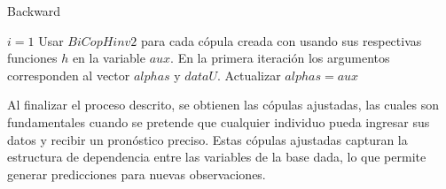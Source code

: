 \begin{algorithm}[H]
      \caption{Backward}
      \label{algbackward}
      \begin{algorithmic}[1]  
        
        \State $i = 1$
          \State Usar $BiCopHinv2$ para cada cópula creada con usando sus respectivas funciones $h$ en la variable $aux$. En la primera iteración los argumentos corresponden al vector $alphas$ y $dataU$.
          \State Actualizar $alphas = aux$
        \EndWhile
       
      \end{algorithmic}
    \end{algorithm}

Al finalizar el proceso descrito, se obtienen las cópulas ajustadas, las cuales son fundamentales cuando se pretende que cualquier individuo pueda ingresar sus datos y recibir un pronóstico preciso. Estas cópulas ajustadas capturan la estructura de dependencia entre las variables de la base dada, lo que permite generar predicciones para nuevas observaciones. 